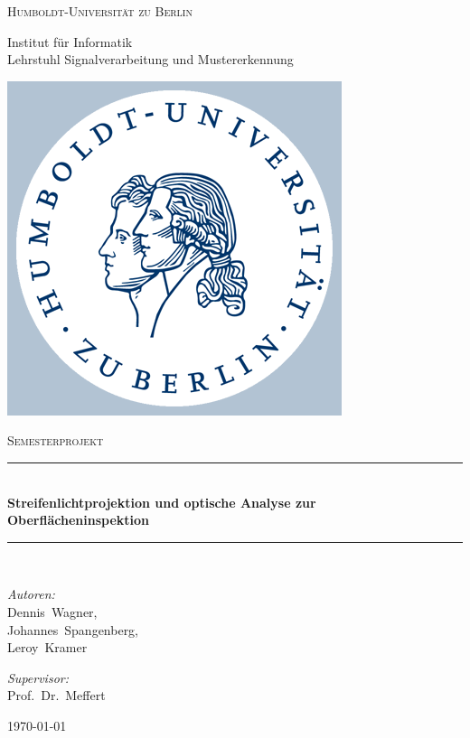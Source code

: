 
\begin{titlepage}
\begin{center}

\begin{minipage}{\textwidth}
	\begin{minipage}[c]{.8\textwidth}
		\textsc{\LARGE Humboldt-Universität zu Berlin}
		
		Institut für Informatik\\
		Lehrstuhl Signalverarbeitung und Mustererkennung
	\end{minipage}\hfill
	\begin{minipage}[c]{.2\textwidth}
		\includegraphics{husiegel}
	\end{minipage}
\end{minipage}
\vspace{1.5cm}

\textsc{\Large Semesterprojekt}\\[0.5cm]

\newcommand{\HRule}{\rule{\linewidth}{0.5mm}}
\HRule \\[0.4cm]
{\huge \bfseries Streifenlichtprojektion und optische Analyse zur Oberflächeninspektion}
\HRule \\[1.5cm]

\begin{minipage}{0.4\textwidth}
\begin{flushleft} \large
\emph{Autoren:}\\
Dennis~Wagner,\\
Johannes~Spangenberg,\\
Leroy~Kramer
\end{flushleft}
\end{minipage}
\hfill
\begin{minipage}{0.4\textwidth}
\begin{flushright} \large
\emph{Supervisor:} \\
Prof.~Dr.~Meffert
\end{flushright}
\end{minipage}

\vfill

{\large \today}

\end{center}
\end{titlepage}
